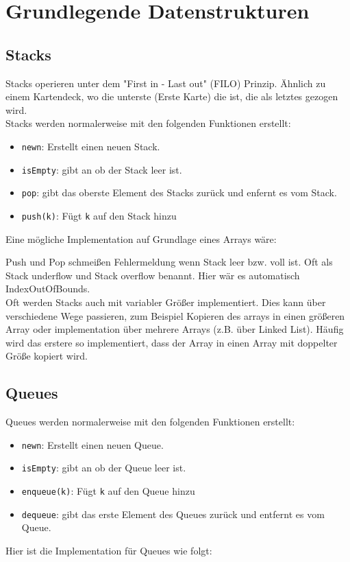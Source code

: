 \documentclass[
../../AuD-Zusammenfassung.tex,
]
{subfiles}
\begin{document}
\section{Grundlegende Datenstrukturen}
\subsection{Stacks}
Stacks operieren unter dem "First in - Last out" (FILO) Prinzip. Ähnlich zu einem Kartendeck, wo die unterste (Erste Karte) die ist, die als letztes gezogen wird. \\
Stacks werden normalerweise mit den folgenden Funktionen erstellt:
\begin{itemize}
    \item \texttt{new{n}}: Erstellt einen neuen Stack.
    \item \texttt{isEmpty}: gibt an ob der Stack leer ist.
    \item \texttt{pop}: gibt das oberste Element des Stacks zurück und enfernt es vom Stack.
    \item \texttt{push(k)}: Fügt \texttt{k} auf den Stack hinzu
\end{itemize}
Eine mögliche Implementation auf Grundlage eines Arrays wäre:


Push und Pop schmeißen Fehlermeldung wenn Stack leer bzw. voll ist. Oft als Stack underflow und Stack overflow benannt. Hier wär es automatisch IndexOutOfBounds.\\ Oft werden Stacks auch mit variabler Größer implementiert. Dies kann über verschiedene Wege passieren, zum Beispiel Kopieren des arrays in einen größeren Array oder implementation über mehrere Arrays (z.B. über Linked List). Häufig wird das erstere so implementiert, dass der Array in einen Array mit doppelter Größe kopiert wird.

\newpage
\subsection{Queues}
Queues werden normalerweise mit den folgenden Funktionen erstellt:
\begin{itemize}
    \item \texttt{new{n}}: Erstellt einen neuen Queue.
    \item \texttt{isEmpty}: gibt an ob der Queue leer ist.
    \item \texttt{enqueue(k)}: Fügt \texttt{k} auf den Queue hinzu
    \item \texttt{dequeue}: gibt das erste Element des Queues zurück und entfernt es vom Queue.
\end{itemize}
Hier ist die Implementation für Queues wie folgt:
\end{document}
